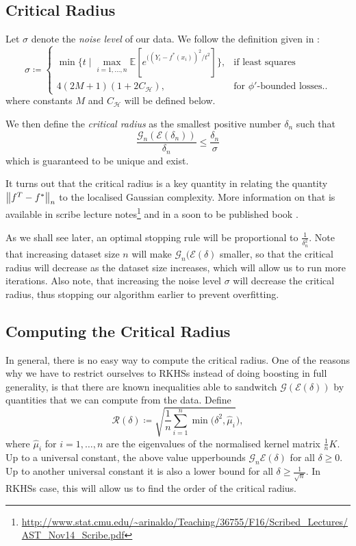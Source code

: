 \subsection{Critical Radius}

Let $\sigma$ denote the \textit{noise level} of our data. We follow the definition
given in \citet{wain17ada}:
$$
\sigma \coloneqq
\begin{cases}
  \min\{t \mid \underset{i = 1, \dots, n}{\max} \mathbb{E}[e^{((Y_{i} - f^{*}(x_{i}))^{2}/t^{2}}] \}, & \text{if least squares} \\
  4(2M + 1)(1 + 2C_{\mathcal{H}}), & \text{for } \phi'\text{-bounded losses.}.
\end{cases}
$$
where constants $M$ and $C_{\mathcal{H}}$ will be defined below.

We then define the \textit{critical radius} as the smallest positive number $\delta_{n}$ such that
\begin{equation*}
  \frac{\mathcal{G}_n(\mathcal{E}(\delta_{n}))}{\delta_n} \le \frac{\delta_{n}}{\sigma}
\end{equation*}
which is guaranteed to be unique and exist.

It turns out that the critical radius is a key quantity in relating the quantity
$\left\lVert f^{T} - f^{*}\right\rVert_{n}$ to the localised Gaussian complexity.
More information on that is available in scribe lecture notes\footnote{\url{http://www.stat.cmu.edu/~arinaldo/Teaching/36755/F16/Scribed_Lectures/AST_Nov14_Scribe.pdf}} and in a soon to
be published book \citet{wainwright2017high}.

As we shall see later, an optimal stopping rule will be proportional to $\frac{1}{\delta_{n}^{2}}$.
Note that increasing dataset size $n$ will make $\mathcal{G}_{n}(\mathcal{E}(\delta)$ smaller,
so that the critical radius will decrease as the dataset size increases, which will
allow us to run more iterations. Also note, that increasing the noise level $\sigma$
will decrease the critical radius, thus stopping our algorithm earlier to prevent
overfitting.

\subsection{Computing the Critical Radius}

In general, there is no easy way to compute the critical radius.
One of the reasons why we have to restrict ourselves to RKHSs instead of doing
boosting in full generality, is that there are known inequalities able to sandwitch
$\mathcal{G}(\mathcal{E}(\delta))$ by quantities that we can compute from the data.
Define
$$
\mathcal{R}(\delta) \coloneqq \sqrt{\frac{1}{n} \sum_{i=1}^{n} \min(\delta^{2}, \hat{\mu}_{i}}),
$$
where $\hat{\mu}_{i}$ for $i = 1, \dots, n$ are the eigenvalues of the normalised
kernel matrix $\frac{1}{n}K$.
Up to a universal constant, the above value upperbounds $\mathcal{G}_{n}{\mathcal{E}(\delta)}$
for all $\delta \geq 0$. Up to another universal constant it is also a lower bound for all
$\delta \geq \frac{1}{\sqrt{n}}$. In RKHSs case, this will allow us to find the order
of the critical radius.


